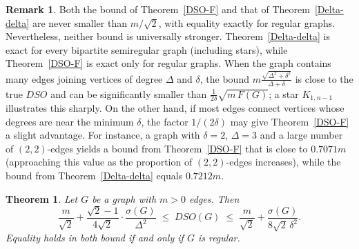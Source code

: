 \documentclass{article}
\newtheorem{theorem}{Theorem}
\theoremstyle{definition}
\newtheorem{remark}{Remark}
\begin{document}
\begin{remark}\label{rem:compare-B-C}
Both the bound of Theorem~\ref{DSO-F} and that of Theorem~\ref{Delta-delta} are never smaller than $m/\sqrt{2}$, with equality exactly for regular graphs.
Nevertheless, neither bound is universally stronger.
Theorem~\ref{Delta-delta} is exact for every bipartite semiregular graph (including stars), while Theorem~\ref{DSO-F} is exact only for regular graphs.
When the graph contains many edges joining vertices of degree $\Delta$ and $\delta$, the bound $m\frac{\sqrt{\Delta^{2}+\delta^{2}}}{\Delta+\delta}$ is close to the true $DSO$ and can be significantly smaller than $\frac{1}{2\delta}\sqrt{m\,F(G)}$; a star $K_{1,n-1}$ illustrates this sharply.
On the other hand, if most edges connect vertices whose degrees are near the minimum $\delta$, the factor $1/(2\delta)$ may give Theorem~\ref{DSO-F} a slight advantage.
For instance, a graph with $\delta=2$, $\Delta=3$ and a large number of $(2,2)$-edges yields a bound from Theorem~\ref{DSO-F} that is close to $0.7071m$ (approaching this value as the proportion of $(2,2)$-edges increases), while the bound from Theorem~\ref{Delta-delta} equals $0.7212m$.
\end{remark}


\begin{theorem}\label{thm:DSO-sigma}
Let $G$ be a graph with $m>0$ edges. Then
\[
\frac{m}{\sqrt{2}} + \frac{\sqrt{2}-1}{4\sqrt{2}} \cdot \frac{\sigma(G)}{\Delta^2}
\;\le\; DSO(G)
\;\le\; \frac{m}{\sqrt{2}} + \frac{\sigma(G)}{8\sqrt{2}\,\delta^2}.
\]
Equality holds in both bound if and only if $G$ is regular.
\end{theorem}
\end{document}
